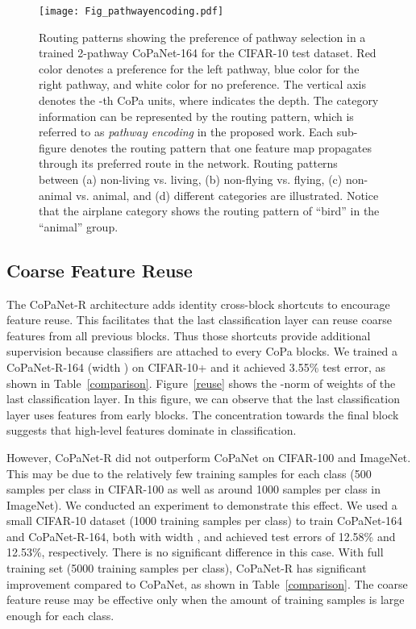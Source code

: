 \documentclass[wcp]{jmlr}
\begin{document}
\begin{figure*}
\begin{center}
	\texttt{[image: Fig\_pathwayencoding.pdf]}
\end{center}
   \caption{Routing patterns showing the preference of pathway selection in a trained 2-pathway CoPaNet-164 for the CIFAR-10 test dataset. Red color denotes a preference for the left pathway, blue color for the right pathway, and white color for no preference. The vertical axis denotes the -th CoPa units, where  indicates the depth.  The category information can be represented by the routing pattern, which is referred to as  \textit{pathway encoding} in the proposed work. Each sub-figure denotes the routing pattern that one feature map propagates through its preferred route in the network.
Routing patterns between (a) non-living vs. living, (b) non-flying vs. flying, (c) non-animal vs. animal, and (d) different categories are illustrated. Notice that the airplane category shows the routing pattern of ``bird'' in the ``animal'' group.}
\label{pathwayencode}
\end{figure*}


\subsection{Coarse Feature Reuse}
The CoPaNet-R architecture adds identity cross-block shortcuts to encourage feature reuse.
This facilitates that the last classification layer can reuse coarse features from all previous blocks.
Thus those shortcuts provide additional supervision because classifiers are attached to every CoPa blocks.
We trained a CoPaNet-R-164 (width ) on CIFAR-10+ and it achieved 3.55\% test error, as shown in Table~\ref{comparison}.
Figure~\ref{reuse} shows the -norm of weights of the last classification layer. 
In this figure, we can observe that the last classification layer uses features from early blocks.
The concentration towards the final block suggests that high-level features dominate in classification.

However, CoPaNet-R did not outperform CoPaNet on CIFAR-100 and ImageNet.
This may be due to the relatively few training samples for each class (500 samples per class in CIFAR-100 as well as around 1000 samples per class in ImageNet).
We conducted an experiment to demonstrate this effect.
We used a small CIFAR-10 dataset (1000 training samples per class) to train CoPaNet-164 and CoPaNet-R-164, both with width , and achieved test errors of 12.58\% and 12.53\%, respectively.
There is no significant difference in this case.
With full training set (5000 training samples per class), CoPaNet-R has significant improvement compared to CoPaNet, as shown in Table~\ref{comparison}.
The coarse feature reuse may be effective only when the amount of training samples is large enough for each class.
\end{document}
